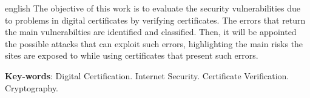 \begin{resumo}[Abstract]
 \begin{otherlanguage*}{english}
	The objective of this work is to evaluate the security vulnerabilities due to problems in digital certificates by verifying certificates. The errors that return the main vulnerabilties are identified and classified.  Then, it will be appointed the possible attacks that can exploit such errors, highlighting the main risks the sites are exposed to while using certificates that present such errors.

   \vspace{\onelineskip}
 
   \noindent 
   \textbf{Key-words}: Digital Certification. Internet Security. Certificate Verification. Cryptography. 
 \end{otherlanguage*}
\end{resumo}
